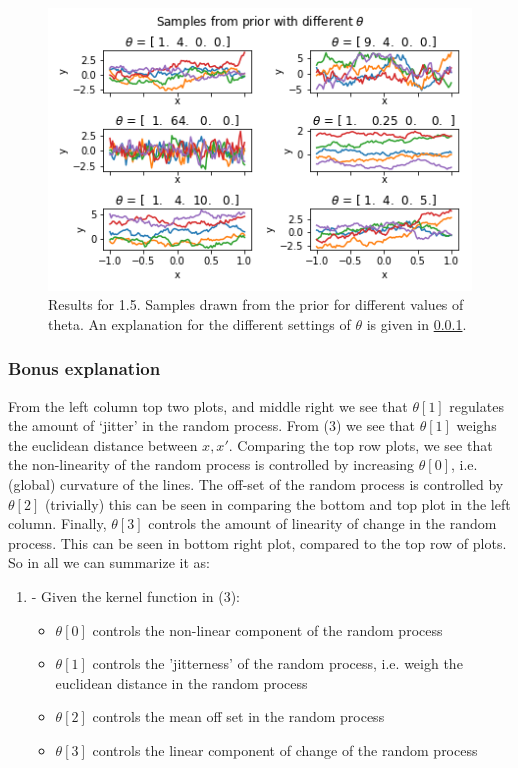 \documentclass[11pt]{article}
\makeatletter
\def\maxwidth{\ifdim\Gin@nat@width>\linewidth\linewidth
    \else\Gin@nat@width\fi}
\let\Oldincludegraphics\includegraphics
\renewcommand{\includegraphics}[1]{\Oldincludegraphics[width=.8\maxwidth]{#1}}
\makeatother
\begin{document}
	\begin{figure}[H]
	\includegraphics{../Figures/1.5.png}
	\caption{Results for 1.5. Samples drawn from the prior for different values of theta. An explanation for the different settings of $\theta$ is given in \ref{bonus-explanation}.}
	\end{figure}

    \subsubsection{Bonus explanation}\label{bonus-explanation} 

From the left column top two plots, and middle right we see that
\(\theta[1]\) regulates the amount of `jitter' in the random process.
From (3) we see that \(\theta[1]\) weighs the euclidean distance between
\(x, x'\). Comparing the top row plots, we see that the non-linearity of
the random process is controlled by increasing \(\theta[0]\), i.e.
(global) curvature of the lines. The off-set of the random process is
controlled by \(\theta[2]\) (trivially) this can be seen in comparing
the bottom and top plot in the left column. Finally, \(\theta[3]\)
controls the amount of linearity of change in the random process. This
can be seen in bottom right plot, compared to the top row of plots. So
in all we can summarize it as:

\begin{enumerate}
  \item - Given the kernel function in (3):
  \begin{itemize}
  \item  $\theta[0]$ controls the non-linear component of the random process

  \item  $\theta[1]$ controls the 'jitterness' of the random process, i.e. weigh the euclidean distance in the random process

  \item $\theta[2]$ controls the mean off set in the random process

  \item $\theta[3]$ controls the linear component of change of the random process
  \end{itemize}
\end{enumerate}
\end{document}
